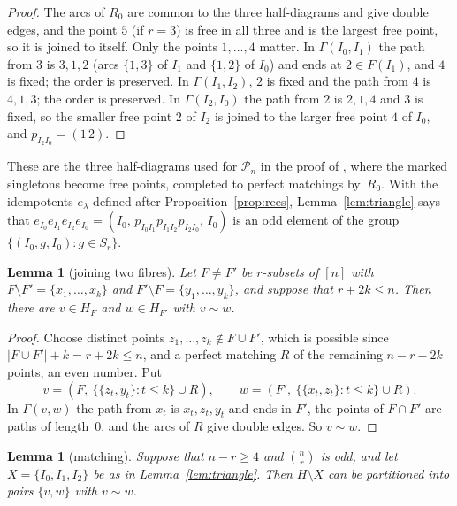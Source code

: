 \documentclass[11pt]{article}
\newtheorem{lemma}[theorem]{Lemma}
\theoremstyle{remark}
\begin{document}
\begin{proof}
The arcs of $R_0$ are common to the three half-diagrams and give double edges,
and the point $5$ (if $r=3$) is free in all three and is the largest free
point, so it is joined to itself. Only the points $1,\dots,4$ matter. In
$\Gamma(I_0,I_1)$ the path from $3$ is $3,1,2$ (arcs $\{1,3\}$ of $I_1$ and
$\{1,2\}$ of $I_0$) and ends at $2\in F(I_1)$, and $4$ is fixed; the order is
preserved. In $\Gamma(I_1,I_2)$, $2$ is fixed and the path from $4$ is $4,1,3$;
the order is preserved. In $\Gamma(I_2,I_0)$ the path from $2$ is $2,1,4$ and
$3$ is fixed, so the smaller free point $2$ of $I_2$ is joined to the larger
free point $4$ of $I_0$, and $p_{I_2I_0}=(1\,2)$.
\end{proof}

These are the three half-diagrams used for $\mathcal P_n$ in the proof of
\cite[Theorem~8.5]{abchk}, where the marked singletons become free points,
completed to perfect matchings by~$R_0$. With the idempotents $e_\lambda$
defined after Proposition~\ref{prop:rees}, Lemma~\ref{lem:triangle} says that
$e_{I_0}e_{I_1}e_{I_2}e_{I_0}=(I_0,\,p_{I_0I_1}p_{I_1I_2}p_{I_2I_0},\,I_0)$
is an odd element of the group $\{(I_0,g,I_0):g\in S_r\}$.

\begin{lemma}[joining two fibres]\label{lem:join}
Let $F\ne F'$ be $r$-subsets of $[n]$ with $F\setminus F'=\{x_1,\dots,x_k\}$
and $F'\setminus F=\{y_1,\dots,y_k\}$, and suppose that $r+2k\le n$. Then
there are $v\in H_F$ and $w\in H_{F'}$ with $v\sim w$.
\end{lemma}

\begin{proof}
Choose distinct points $z_1,\dots,z_k\notin F\cup F'$, which is possible since
$|F\cup F'|+k=r+2k\le n$, and a perfect matching $R$ of the remaining
$n-r-2k$ points, an even number. Put
\[
 v=(F,\ \{\{z_t,y_t\}:t\le k\}\cup R),\qquad w=(F',\ \{\{x_t,z_t\}:t\le k\}\cup
 R).
\]
In $\Gamma(v,w)$ the path from $x_t$ is $x_t,z_t,y_t$ and ends in $F'$, the
points of $F\cap F'$ are paths of length~$0$, and the arcs of $R$ give double
edges. So $v\sim w$.
\end{proof}

\begin{lemma}[matching]\label{lem:matching}
Suppose that $n-r\ge4$ and $\binom nr$ is odd, and let $X=\{I_0,I_1,I_2\}$ be
as in Lemma~\ref{lem:triangle}. Then $H\setminus X$ can be partitioned into
pairs $\{v,w\}$ with $v\sim w$.
\end{lemma}
\end{document}
